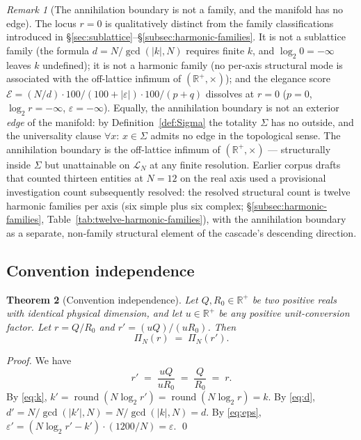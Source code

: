 \documentclass[11pt,a4paper]{article}
\newtheorem{theorem}{Theorem}[section]
\theoremstyle{definition}
\theoremstyle{remark}
\newtheorem{remark}[theorem]{Remark}
\newcommand{\R}{\mathbb{R}}
\DeclareMathOperator{\round}{round}
\newcommand{\eps}{\varepsilon}
\begin{document}
\begin{remark}[The annihilation boundary is not a family, and the manifold has no edge]\label{rem:AB-not-family}
The locus $r=0$ is qualitatively distinct from the family classifications introduced in \S\ref{sec:sublattice}--\S\ref{subsec:harmonic-families}. It is not a sublattice family (the formula $d = N/\gcd(|k|,N)$ requires finite $k$, and $\log_{2} 0 = -\infty$ leaves $k$ undefined); it is not a harmonic family (no per-axis structural mode is associated with the off-lattice infimum of $(\R^{+},\times)$); and the elegance score $\mathcal{E} = (N/d)\cdot 100/(100+|\varepsilon|) \cdot 100/(p+q)$ dissolves at $r=0$ ($p=0$, $\log_{2} r = -\infty$, $\varepsilon = -\infty$). Equally, the annihilation boundary is not an exterior \emph{edge} of the manifold: by Definition~\ref{def:Sigma} the totality $\Sigma$ has no outside, and the universality clause $\forall x:\, x \in \Sigma$ admits no edge in the topological sense. The annihilation boundary is the off-lattice infimum of $(\R^{+},\times)$ --- structurally inside $\Sigma$ but unattainable on $\mathcal{L}_{N}$ at any finite resolution. Earlier corpus drafts that counted thirteen entities at $N=12$ on the real axis used a provisional investigation count subsequently resolved: the resolved structural count is twelve harmonic families per axis (six simple plus six complex; \S\ref{subsec:harmonic-families}, Table~\ref{tab:twelve-harmonic-families}), with the annihilation boundary as a separate, non-family structural element of the cascade's descending direction.
\end{remark}

\subsection{Convention independence}

\begin{theorem}[Convention independence]\label{thm:conv}
Let $Q,R_{0}\in\R^{+}$ be two positive reals with identical physical dimension, and let $u\in\R^{+}$ be any positive unit-conversion factor. Let $r = Q/R_{0}$ and $r' = (uQ)/(uR_{0})$. Then
\[
\Pi_{N}(r) \;=\; \Pi_{N}(r').
\]
\end{theorem}

\begin{proof}
We have
\[
r' \;=\; \frac{uQ}{uR_{0}} \;=\; \frac{Q}{R_{0}} \;=\; r.
\]
By \eqref{eq:k}, $k' = \round(N\log_{2}r') = \round(N\log_{2}r) = k$. By \eqref{eq:d}, $d'=N/\gcd(|k'|,N) = N/\gcd(|k|,N) = d$. By \eqref{eq:eps}, $\eps' = (N\log_{2}r'-k')\cdot(1200/N) = \eps$. \qed
\end{proof}
\end{document}
